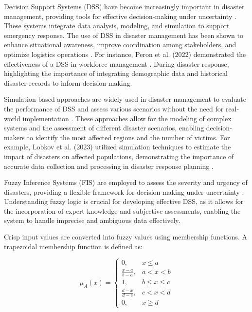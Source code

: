 \documentclass[journal,final,a4paper,twoside,11pt]{IEEEtran}
\begin{document}
Decision Support Systems (DSS) have become increasingly important in disaster management, providing tools for effective decision-making under uncertainty \cite{khan2023systematic}. These systems integrate data analysis, modeling, and simulation to support emergency response\cite{alghodhaifi2021autonomous}. The use of DSS in disaster management has been shown to enhance situational awareness, improve coordination among stakeholders, and optimize logistics operations \cite{adetiloye2021collaboration}. For instance, Peron et al. (2022) demonstrated the effectiveness of a DSS in workforce management \cite{peron2022decision}. During disaster response, highlighting the importance of integrating demographic data and historical disaster records to inform decision-making\cite{suarez2024integrated}.

Simulation-based approaches are widely used in disaster management to evaluate the performance of DSS and assess various scenarios without the need for real-world implementation \cite{chang2022simulation}. These approaches allow for the modeling of complex systems and the assessment of different disaster scenarios, enabling decision-makers to identify the most affected regions and the number of victims. For example, Lobkov et al. (2023) utilized simulation techniques to estimate the impact of disasters on affected populations, demonstrating the importance of accurate data collection and processing in disaster response planning \cite{lobkov2023determination}. 

Fuzzy Inference Systems (FIS) are employed to assess the severity and urgency of disasters, providing a flexible framework for decision-making under uncertainty \cite{anjomshoae2021integrated}. 
Understanding fuzzy logic is crucial for developing effective DSS, as it allows for the incorporation of expert knowledge and subjective assessments, enabling the system to handle imprecise and ambiguous data effectively\cite{improta2020fuzzy}. 

Crisp input values are converted into fuzzy values using membership functions. A trapezoidal membership function is defined as:

\[
\mu_A(x) = 
\begin{cases}
0, & x \leq a \\
\frac{x - a}{b - a}, & a < x < b \\
1, & b \leq x \leq c \\
\frac{d - x}{d - c}, & c < x < d \\
0, & x \geq d
\end{cases}
\]
\end{document}
